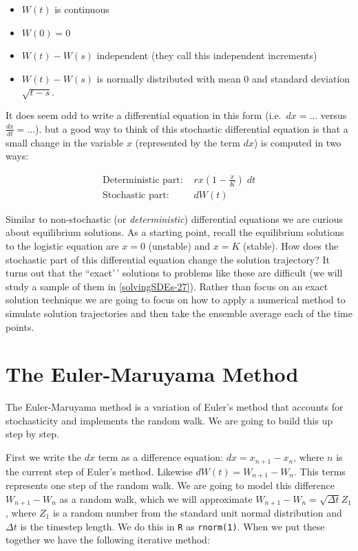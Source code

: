 \documentclass[
]{book}
\providecommand{\tightlist}{%
  \setlength{\itemsep}{0pt}\setlength{\parskip}{0pt}}
\theoremstyle{definition}
\theoremstyle{definition}
\theoremstyle{definition}
\theoremstyle{remark}
\begin{document}
\begin{itemize}
\tightlist
\item
  \(W(t)\) is continuous
\item
  \(W(0)=0\)
\item
  \(W(t)-W(s)\) independent (they call this independent increments)
\item
  \(W(t)-W(s)\) is normally distributed with mean 0 and standard deviation \(\sqrt{t-s}\).
\end{itemize}

It does seem odd to write a differential equation in this form (i.e.~\(dx = ...\) versus \(\displaystyle \frac{dx}{dt} = ...\)). but a good way to think of this stochastic differential equation is that a small change in the variable \(x\) (represented by the term \(dx\)) is computed in two ways:

\begin{equation*}
\begin{split}
\mbox{Deterministic part: } & rx \left(1 - \frac{x}{K} \right) \; dt \\
\mbox{Stochastic part: } & dW(t)
\end{split}
\end{equation*}

Similar to non-stochastic (or \emph{deterministic}) differential equations we are curious about equilibrium solutions. As a starting point, recall the equilibrium solutions to the logistic equation are \(x=0\) (unstable) and \(x=K\) (stable). How does the stochastic part of this differential equation change the solution trajectory? It turns out that the ``exact'\,' solutions to problems like these are difficult (we will study a sample of them in \ref{solvingSDEs-27}). Rather than focus on an exact solution technique we are going to focus on how to apply a numerical method to simulate solution trajectories and then take the ensemble average each of the time points.

\hypertarget{the-euler-maruyama-method}{%
\section{The Euler-Maruyama Method}\label{the-euler-maruyama-method}}

The Euler-Maruyama method is a variation of Euler's method that accounts for stochasticity and implements the random walk. We are going to build this up step by step.

First we write the \(dx\) term as a difference equation: \(dx = x_{n+1}-x_{n}\), where \(n\) is the current step of Euler's method. Likewise \(dW(t) = W_{n+1} - W_{n}\). This terms represents one step of the random walk. We are going to model this difference \(W_{n+1} - W_{n}\) as a random walk, which we will approximate \(W_{n+1}-W_{n} = \sqrt{\Delta t} Z_{1}\), where \(Z_{1}\) is a random number from the standard unit normal distribution and \(\Delta t\) is the timestep length. We do this in \texttt{R} as \texttt{rnorm(1)}. When we put these together we have the following iterative method:
\end{document}
